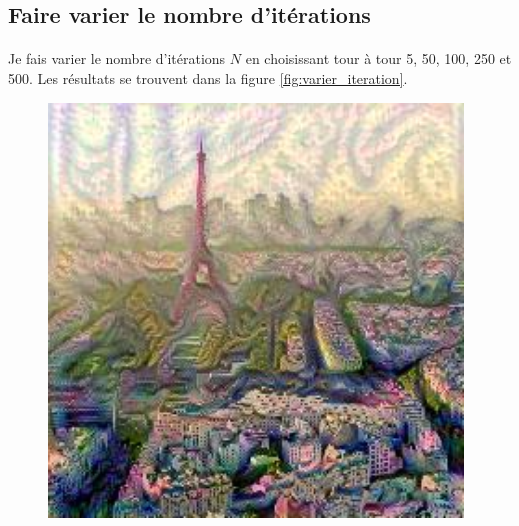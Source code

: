 \documentclass{article}
\begin{document}
\subsection*{Faire varier le nombre d'itérations}
\paragraph*{}
Je fais varier le nombre d'itérations $N$ en choisissant tour à tour 5, 50, 100, 250 et 500. Les résultats se trouvent dans la figure \ref{fig:varier_iteration}.
\begin{figure}[!htb]
\centering
\begin{minipage}{0.2\textwidth}
\centering
\includegraphics[width=0.98\textwidth]{../Images/transfer/paris_starrynight_1e4_5.jpg}
\end{minipage}%
\begin{minipage}{0.2\textwidth}
\centering

\end{minipage}
\end{figure}
\end{document}
